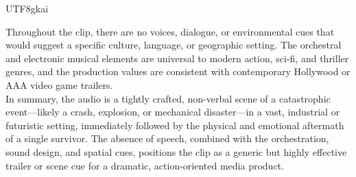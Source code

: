 \begin{CJK*}{UTF8}{gkai}
\begin{tcolorbox}
Throughout the clip, there are no voices, dialogue, or environmental cues that would suggest a specific culture, language, or geographic setting. The orchestral and electronic musical elements are universal to modern action, sci-fi, and thriller genres, and the production values are consistent with contemporary Hollywood or AAA video game trailers.\\

In summary, the audio is a tightly crafted, non-verbal scene of a catastrophic event—likely a crash, explosion, or mechanical disaster—in a vast, industrial or futuristic setting, immediately followed by the physical and emotional aftermath of a single survivor. The absence of speech, combined with the orchestration, sound design, and spatial cues, positions the clip as a generic but highly effective trailer or scene cue for a dramatic, action-oriented media product.\\


\end{tcolorbox}
\end{CJK*}




